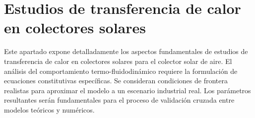 \section{Estudios de transferencia de calor en colectores solares}
\label{sec:cap03_estudios_transferencia}

Este apartado expone detalladamente los aspectos fundamentales de estudios de transferencia de calor en colectores solares para el colector solar de aire.
El análisis del comportamiento termo-fluidodinámico requiere la formulación de ecuaciones constitutivas específicas.
Se consideran condiciones de frontera realistas para aproximar el modelo a un escenario industrial real.
Los parámetros resultantes serán fundamentales para el proceso de validación cruzada entre modelos teóricos y numéricos.
